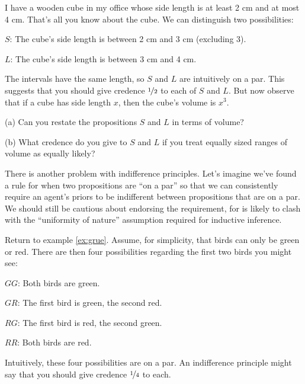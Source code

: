 \begin{exercise}{2}\label{e:cubefactory}
  I have a wooden cube in my office whose side length is at least 2 cm and at
  most 4 cm. That's all you know about the cube. We can distinguish two
  possibilities:
  \begin{enumerate*}
  \item[$S$:] The cube's side length is between 2 cm and 3 cm (excluding 3).
  \item[$L$:] The cube's side length is between 3 cm and 4 cm.
  \end{enumerate*}
  The intervals have the same length, so $S$ and $L$ are intuitively on a par.
  This suggests that you should give credence $\nicefrac{1}{2}$ to each of $S$
  and $L$. But now observe that if a cube has side length $x$, then the cube's
  volume is $x^3$.
  \begin{enumerate*}
  \item[(a)] Can you restate the propositions $S$ and $L$ in terms of
    volume?
  \item[(b)] What credence do you give to $S$ and $L$ if you treat equally
    sized ranges of volume as equally likely?
  \end{enumerate*}
  \vspace{-3mm}
\end{exercise}

There is another problem with indifference principles. Let's imagine we've found
a rule for when two propositions are ``on a par'' so that we can consistently
require an agent's priors to be indifferent between propositions that are on a
par. We should still be cautious about endorsing the requirement, for is likely
to clash with the ``uniformity of nature'' assumption required for inductive
inference.

Return to example \ref{ex:grue}. Assume, for simplicity, that birds can only be green
or red. There are then four possibilities regarding the first two birds you
might see:
\begin{enumerate*}
\item[$GG$:] Both birds are green.
\item[$GR$:] The first bird is green, the second red.
\item[$RG$:] The first bird is red, the second green.
\item[$RR$:] Both birds are red. 
\end{enumerate*}
Intuitively, these four possibilities are on a par. An indifference principle
might say that you should give credence $\nicefrac{1}{4}$ to each.

